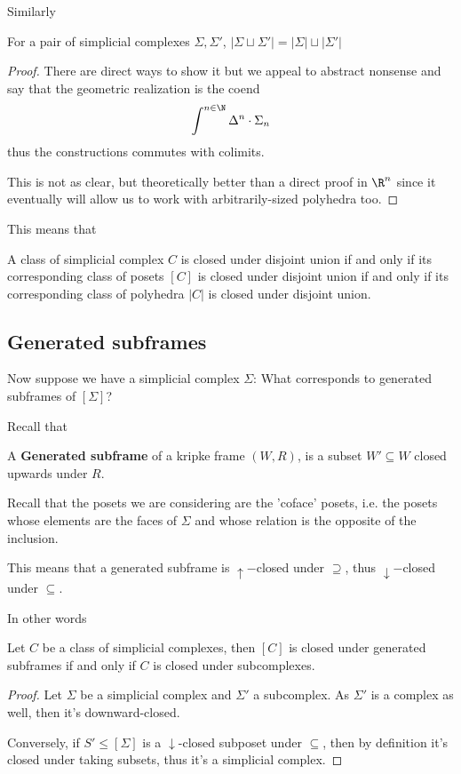 Similarly
\begin{proposition}
    For a pair of simplicial complexes $\Sigma,\Sigma'$, $|\Sigma\sqcup \Sigma'|=|\Sigma|\sqcup|\Sigma'|$
\end{proposition}
\begin{proof}
    There are direct ways to show it but we appeal to abstract nonsense and say that the geometric realization is the coend 
    \[\int^{n\in \N}\Delta^n\cdot \Sigma_n\] 
    thus the constructions commutes with colimits.

    This is not as clear, but theoretically better than a direct proof in $\R^n$ 
    since it eventually will allow us to work with arbitrarily-sized polyhedra too.
\end{proof}

This means that
\begin{lemma}
    A class of simplicial complex $C$ is closed under disjoint union if and only if its corresponding class of posets $[C]$ is closed under disjoint union
    if and only if its corresponding class of polyhedra $|C|$ is closed under disjoint union.
\end{lemma}

\subsection{Generated subframes}

Now suppose we have a simplicial complex $\Sigma$: What corresponds to generated subframes of $[\Sigma]$?

Recall that
\begin{definition}

    A \textbf{Generated subframe} of a kripke frame $(W,R)$, is a subset $W'\subseteq W$ closed upwards under $R$.
\end{definition}

Recall that the posets we are considering are the 'coface' posets, i.e. the posets whose 
elements are the faces of $\Sigma$ and whose relation is the opposite of the inclusion.

This means that a generated subframe is $\uparrow-$closed under $\supseteq$, thus $\downarrow-$closed under $\subseteq$.

In other words 
\begin{lemma}\hfill

    Let $C$ be a class of simplicial complexes, then $[C]$ is closed under generated subframes if and only if $C$ is closed under
    subcomplexes. 
\end{lemma}
\begin{proof}\hfill 
    Let $\Sigma$ be a simplicial complex and $\Sigma'$ a subcomplex. 
    As $\Sigma'$ is a complex as well, then it's downward-closed.
    
    Conversely, if $S'\leq[\Sigma]$ is a $\downarrow$-closed subposet under $\subseteq$, 
    then by definition it's closed under taking subsets, thus it's a simplicial complex.
\end{proof}

